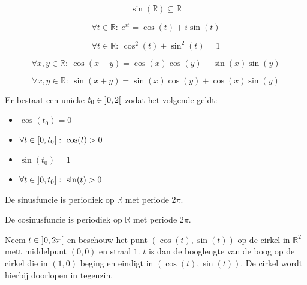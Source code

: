 \documentclass[main.tex]{subfiles}
\begin{document}
\begin{bpr}
  \[ \sin(\mathbb{R}) \subseteq \mathbb{R} \]
\end{bpr}

\begin{bpr}
  \[ \forall t\in \mathbb{R}:\ e^{it} = \cos(t) + i\sin(t) \]
\end{bpr}

\begin{bpr}
  \[ \forall t\in \mathbb{R}:\ \cos^{2}(t) + \sin^{2}(t) = 1 \]
\end{bpr}

\begin{bpr}
  \[ \forall x,y\in \mathbb{R}:\ \cos(x+y) = \cos(x)\cos(y) - \sin(x)\sin(y) \]
\end{bpr}

\begin{bpr}
  \[ \forall x,y\in \mathbb{R}:\ \sin(x+y) = \sin(x)\cos(y) + \cos(x)\sin(y) \]
\end{bpr}

\begin{bpr}
  Er bestaat een unieke $t_{0} \in \interval[open]{0}{2}$ zodat het volgende geldt:
  \begin{itemize}
  \item $\cos(t_{0}) = 0$
  \item $\forall t\in \interval[open right]{0}{t_{0}}:\ \cos(t) > 0$
  \item $\sin(t_{0})=1$
  \item $\forall t\in \interval[open left]{0}{t_{0}}:\ \sin(t)> 0$ 
  \end{itemize}
\end{bpr}

\begin{bpr}
  De sinusfuncie is periodiek op $\mathbb{R}$ met periode $2\pi$.
\end{bpr}

\begin{bpr}
  De cosinusfuncie is periodiek op $\mathbb{R}$ met periode $2\pi$.
\end{bpr}

\begin{bpr}
  Neem $t\in \interval[open]{0}{2\pi}$ en beschouw het punt $(\cos(t),\sin(t))$ op de cirkel in $\mathbb{R}^{2}$ mett middelpunt $(0,0)$ en straal $1$.
  $t$ is dan de booglengte van de boog op de cirkel die in $(1,0)$ beging en eindigt in $(\cos(t),\sin(t))$.
  De cirkel wordt hierbij doorlopen in tegenzin.
\end{bpr}
\end{document}
